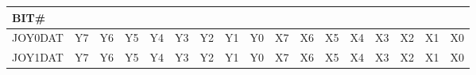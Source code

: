 \documentclass[a4paper,8pt,english]{sphinxmanual}
\begin{document}
\begin{tabulary}{\linewidth}{|L|L|L|L|L|L|L|L|L|L|L|L|L|L|L|L|L|}
\hline
\textsf{\relax 
BIT\#
} & \textsf{
} & \textsf{
} & \textsf{
} & \textsf{
} & \textsf{
} & \textsf{
} & \textsf{
} & \textsf{
} & \textsf{
} & \textsf{
} & \textsf{
} & \textsf{
} & \textsf{
} & \textsf{
} & \textsf{
} & \textsf{
}\\
\hline
JOY0DAT
 & 
Y7
 & 
Y6
 & 
Y5
 & 
Y4
 & 
Y3
 & 
Y2
 & 
Y1
 & 
Y0
 & 
X7
 & 
X6
 & 
X5
 & 
X4
 & 
X3
 & 
X2
 & 
X1
 & 
X0
\\
\hline
JOY1DAT
 & 
Y7
 & 
Y6
 & 
Y5
 & 
Y4
 & 
Y3
 & 
Y2
 & 
Y1
 & 
Y0
 & 
X7
 & 
X6
 & 
X5
 & 
X4
 & 
X3
 & 
X2
 & 
X1
 & 
X0
\\
\hline\end{tabulary}
\end{document}
